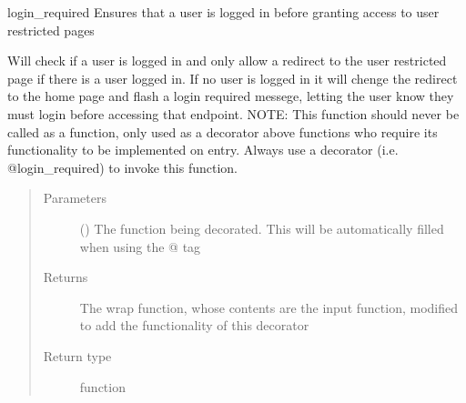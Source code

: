 \documentclass[letterpaper,10pt,english]{sphinxmanual}
\begin{document}
\begin{fulllineitems}
\label{\detokenize{index:config.decorators.login_required}}
login\_required Ensures that a user is logged in before granting access to user restricted pages

Will check if a user is logged in and only allow a redirect to the user restricted page if there is
a user logged in. If no user is logged in it will chenge the redirect to the home page and flash a
login required messege, letting the user know they must login before accessing that endpoint.
NOTE: This function should never be called as a function, only used as a decorator above functions
who require its functionality to be implemented on entry. Always use a decorator (i.e. @login\_required)
to invoke this function.
\begin{quote}\begin{description}
\item[{Parameters}] \leavevmode
{} () \textendash{} The function being decorated. This will be automatically filled when using the @ tag

\item[{Returns}] \leavevmode
The wrap function, whose contents are the input function, modified to add the functionality of this decorator

\item[{Return type}] \leavevmode
function

\end{description}\end{quote}

\end{fulllineitems}

\end{document}
